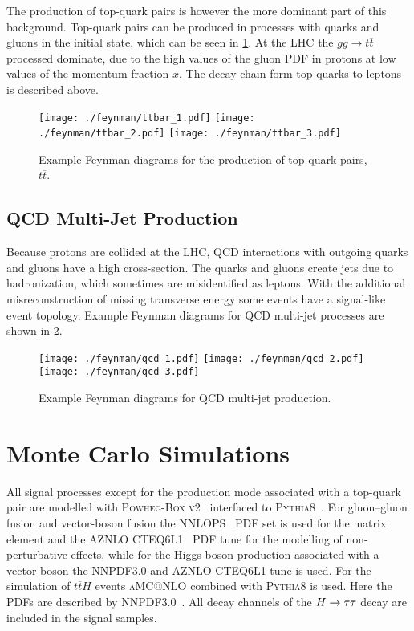 The production of top-quark pairs is however the more dominant part of this background.
Top-quark pairs can be produced in processes with quarks and gluons in the initial state, which can be seen in \cref{fig:processes:ttbar}.
At the LHC the $gg \to t\overline{t}$ processed dominate, due to the high values of the gluon PDF in protons at low values of the
momentum fraction $x$.
The decay chain form top-quarks to leptons is described above.

\begin{figure}[htb]
    \centering
    \texttt{[image: ./feynman/ttbar\_1.pdf]}
    \texttt{[image: ./feynman/ttbar\_2.pdf]}
    \texttt{[image: ./feynman/ttbar\_3.pdf]}
    \caption{Example Feynman diagrams for the production of top-quark pairs, $t\overline{t}$.}\label{fig:processes:ttbar}
\end{figure}

\subsection{QCD Multi-Jet Production}\label{sub:processes:qcd}

Because protons are collided at the LHC, QCD interactions with outgoing quarks and gluons have a high cross-section.
The quarks and gluons create jets due to hadronization, which sometimes are misidentified as leptons.
With the additional misreconstruction of missing transverse energy some events have a signal-like event topology.
Example Feynman diagrams for QCD multi-jet processes are shown in \cref{fig:processes:qcd}.

\begin{figure}[htb]
    \centering
    \texttt{[image: ./feynman/qcd\_1.pdf]}
    \texttt{[image: ./feynman/qcd\_2.pdf]}
    \texttt{[image: ./feynman/qcd\_3.pdf]}
    \caption{Example Feynman diagrams for QCD multi-jet production.}\label{fig:processes:qcd}
\end{figure}

\section{Monte Carlo Simulations}\label{sec:processes:mc}

All signal processes except for the production mode associated with a top-quark pair are modelled with
\textsc{Powheg-Box v2}~\cite{PowhegBox2} interfaced to \textsc{Pythia8}~\cite{Pythia8}.
For gluon--gluon fusion and vector-boson fusion the \textsc{NNLOPS}~\cite{NNLOPS} PDF set is used for the matrix element and the \textsc{AZNLO CTEQ6L1}~\cite{CTEQ6} PDF tune for the
modelling of non-perturbative effects, while for the Higgs-boson production associated with a vector boson the
\textsc{NNPDF3.0} and \textsc{AZNLO CTEQ6L1} tune is used.
For the simulation of $t\overline{t}H$ events \textsc{aMC@NLO} combined with \textsc{Pythia8} is used.
Here the PDFs are described by \textsc{NNPDF3.0}~\cite{NNPDF30}.
All decay channels of the $H \to \tau \tau$ decay are included in the signal samples.

